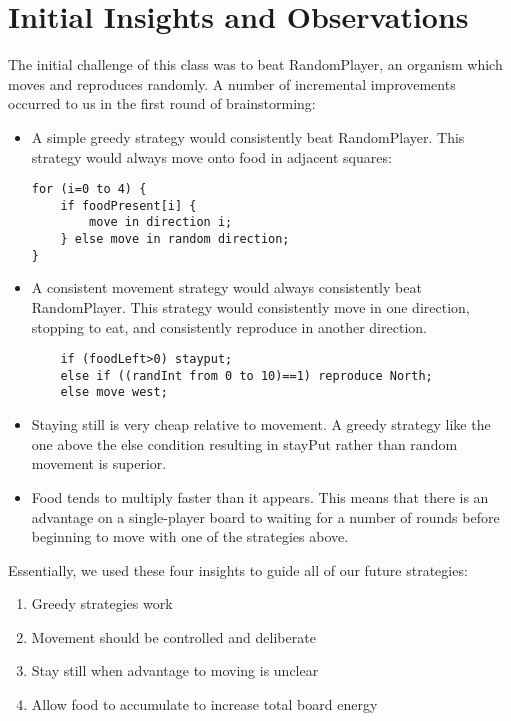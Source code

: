 \section{Initial Insights and Observations}
\label{sec:initial}
The initial challenge of this class was to beat RandomPlayer, an organism which moves and reproduces randomly.  A number of incremental improvements occurred to us in the first round of brainstorming:
\begin{itemize}
\item A simple greedy strategy would consistently beat RandomPlayer.  This strategy would always move onto food in adjacent squares:
\begin{verbatim}
for (i=0 to 4) {
    if foodPresent[i] {
        move in direction i;
    } else move in random direction;
}
\end{verbatim}

\item A consistent movement strategy would always consistently beat RandomPlayer.  This strategy would consistently move in one direction, stopping to eat, and consistently reproduce in another direction.
    
\begin{verbatim}
	if (foodLeft>0) stayput;
	else if ((randInt from 0 to 10)==1) reproduce North;
	else move west;
\end{verbatim}

\item Staying still is very cheap relative to movement.  A greedy strategy like the one above the else condition resulting in stayPut rather than random movement is superior.

\item Food tends to multiply faster than it appears.  This means that there is an advantage on a single-player board to waiting for a number of rounds before beginning to move with one of the strategies above.
\end{itemize}

Essentially, we used these four insights to guide all of our future strategies:
\begin{enumerate}
\item Greedy strategies work
\item Movement should be controlled and deliberate
\item Stay still when advantage to moving is unclear
\item Allow food to accumulate to increase total board energy
\end{enumerate}
